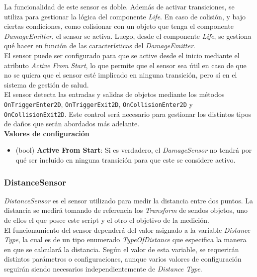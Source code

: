La funcionalidad de este sensor es doble. Además de activar transiciones, se utiliza para gestionar la lógica del componente \textit{Life}. En caso de colisión, y bajo ciertas condiciones, como colisionar con un objeto que tenga el componente \textit{DamageEmitter}, el sensor se activa. Luego, desde el componente \textit{Life}, se gestiona qué hacer en función de las características del \textit{DamageEmitter}.\\

El sensor puede ser configurado para que se active desde el inicio mediante el atributo \textit{Active From Start}, lo que permite que el sensor sea útil en caso de que no se quiera que el sensor esté implicado en ninguna transición, pero sí en el sistema de gestión de salud.\\

El sensor detecta las entradas y salidas de objetos mediante los métodos \texttt{OnTriggerEnter2D}, \texttt{OnTriggerExit2D}, \texttt{OnCollisionEnter2D} y \texttt{OnCollisionExit2D}. Este control será necesario para gestionar los distintos tipos de daños que serán abordados más adelante.\\

\textbf{Valores de configuración}
\begin{itemize}
	\item (bool)\textbf{ Active From Start}: Si es verdadero, el \textit{DamageSensor} no tendrá por qué ser incluido en ninguna transición para que este se considere activo.
\end{itemize}

\subsubsection{DistanceSensor}

\textit{DistanceSensor} es el sensor utilizado para medir la distancia entre dos puntos. La distancia se medirá tomando de referencia los \textit{Transform} de sendos objetos, uno de ellos el que posee este script y el otro el objetivo de la medición.\\

El funcionamiento del sensor dependerá del valor asignado a la variable \textit{Distance Type}, la cual es de un tipo enumerado \textit{TypeOfDistance} que especifica la manera en que se calculará la distancia. Según el valor de esta variable, se requerirán distintos parámetros o configuraciones, aunque varios valores de configuración seguirán siendo necesarios independientemente de \textit{Distance Type}.\\

